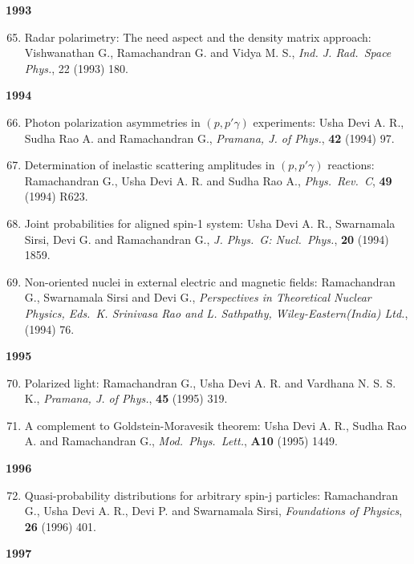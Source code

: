 \textbf{1993}
\begin{enumerate}
\setcounter{enumi}{64}
\item Radar polarimetry: The need aspect and the density matrix approach: Vishwanathan G., Ramachandran G. and Vidya M. S., \textit{Ind. J. Rad.\ Space Phys.}, 22 (1993) 180.
\end{enumerate}
\textbf{1994}
\begin{enumerate}
\setcounter{enumi}{65}
\item Photon polarization asymmetries in $(p, p'\gamma)$ experiments: Usha Devi A. R., Sudha Rao A. and Ramachandran G., \textit{Pramana, J. of Phys.}, {\bf 42} (1994) 97.
\item Determination of inelastic scattering amplitudes in $(p, p'\gamma)$ reactions: Ramachandran G., Usha Devi A. R. and Sudha Rao A., \textit{Phys.\ Rev.\ C}, {\bf 49} (1994) R623.
\item Joint probabilities for aligned spin-1 system: Usha Devi A. R., Swarnamala Sirsi, Devi G. and Ramachandran G., \textit{J. Phys.\ G: Nucl.\ Phys.}, {\bf 20} (1994) 1859.
\item Non-oriented nuclei in external electric and magnetic fields: Ramachandran G., Swarnamala Sirsi and Devi G., \textit{Perspectives in Theoretical Nuclear Physics, Eds.\ K. Srinivasa Rao and L. Sathpathy, Wiley-Eastern(India) Ltd.}, (1994) 76.
\end{enumerate}
\textbf{1995}
\begin{enumerate}
\setcounter{enumi}{69}
\item Polarized light: Ramachandran G., Usha Devi A. R. and Vardhana N. S. S. K., \textit{Pramana, J. of Phys.}, {\bf 45} (1995) 319.
\item A complement to Goldstein-Moravesik theorem: Usha Devi A. R., Sudha Rao A. and Ramachandran G., \textit{Mod.\ Phys.\ Lett.}, {\bf A10} (1995) 1449.
\end{enumerate}
\textbf{1996}
\begin{enumerate}
\setcounter{enumi}{71}
\item Quasi-probability distributions for arbitrary spin-j particles: Ramachandran G., Usha Devi A. R., Devi P. and Swarnamala Sirsi, \textit{Foundations of Physics}, {\bf 26} (1996) 401.
\end{enumerate}
\textbf{1997}
